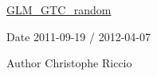 \hyperlink{group__gtc__random}{G\+L\+M\+\_\+\+G\+T\+C\+\_\+random}

\begin{DoxyDate}{Date}
2011-\/09-\/19 / 2012-\/04-\/07 
\end{DoxyDate}
\begin{DoxyAuthor}{Author}
Christophe Riccio 
\end{DoxyAuthor}
